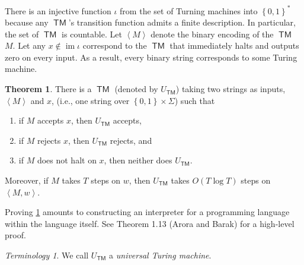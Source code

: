 \documentclass[10pt,letterpaper,cm]{nupset}
\theoremstyle{definition}
\theoremstyle{theorem}
\newtheorem{theorem}[definition]{Theorem}
\theoremstyle{remark}
\newtheorem*{term}{Terminology}
\newcommand{\1}{\mathbf{1}}
\newcommand{\0}{\vec 0}
\DeclareMathOperator{\im}{im}
\DeclareMathOperator{\TM}{\mathsf{TM}}
\begin{document}
\medskip

There is an injective function $\iota$ from the set of Turning machines into $\left\{0,1\right\}^{\ast}$ because any $\TM$'s transition function admits a finite description. In particular, the set of $\TM$ is countable. Let $\left\langle M \right\rangle $ denote the binary encoding of the $\TM$ $M$. Let any $x\notin \im{\iota}$ correspond to the $\TM$ that immediately halts and outputs zero on every input. As a result, every binary string corresponds to some Turing machine. 

\smallskip

\begin{theorem}\label{UTM}
 There is a $\TM$ (denoted by $U_{\TM}$) taking two strings as inputs, $\left\langle M \right\rangle$ and $x$, (i.e., one string over $\left\{0,1\right\} \times \Sigma$) such that
 \begin{enumerate}[label=(\alph*)]
 \item if $M$ accepts $x$, then $U_{\TM}$ accepts,
 \item if $M$ rejects $x$, then $U_{\TM}$ rejects, and
 \item if $M$ does not halt on $x$, then neither does $U_{\TM}$.
 \end{enumerate} Moreover, if $M$ takes $T$ steps on $w$, then $U_{\TM}$ takes $O(T \log{T})$ steps on $\left\langle M, w \right\rangle$.
\end{theorem}

Proving \cref{UTM} amounts to constructing an interpreter for a programming language within the language itself. See Theorem 1.13 (Arora and Barak) for a high-level proof.

\begin{term}
We call $U_{\TM}$ a \textit{universal Turing machine}.
\end{term}

\medskip
\end{document}
